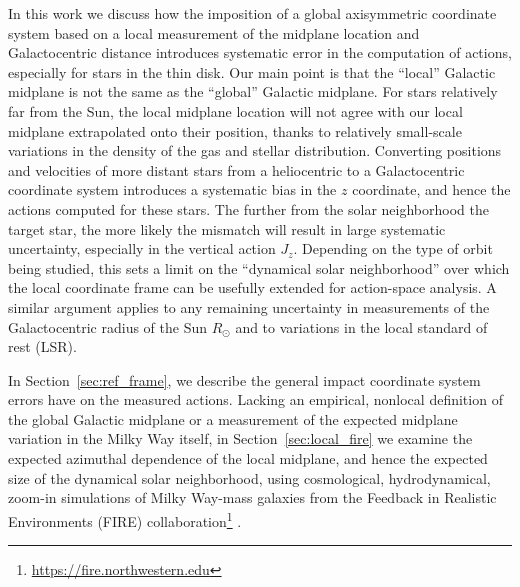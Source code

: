 \documentclass[twocolumn]{aastex62}
\begin{document}
In this work we discuss how the imposition of a global axisymmetric coordinate
system based on a local measurement of the midplane location and
Galactocentric distance introduces systematic error in the computation of
actions, especially for stars in the thin disk. Our main point is that the
``local'' Galactic midplane is not the same as the ``global'' Galactic
midplane. For stars relatively far from the Sun, the local midplane location
will not agree with our local midplane extrapolated onto their position,
thanks to relatively small-scale variations in the density of the gas and
stellar distribution. Converting positions and velocities of more distant
stars from a heliocentric to a Galactocentric coordinate system introduces a
systematic bias in the $z$ coordinate, and hence the actions computed for
these stars. The further from the solar neighborhood the target star, the more
likely the mismatch will result in large systematic uncertainty, especially in
the vertical action $J_z$. Depending on the type of orbit being studied, this
sets a limit on the ``dynamical solar neighborhood'' over which the local
coordinate frame can be usefully extended for action-space analysis. A similar
argument applies to any remaining uncertainty in measurements of the
Galactocentric radius of the Sun $R_{\odot}$ and to variations in the local
standard of rest (LSR).

In Section~\ref{sec:ref_frame}, we describe the general impact coordinate
system errors have on the measured actions. Lacking an empirical, nonlocal
definition of the global Galactic midplane or a measurement of the expected
midplane variation in the Milky Way itself,  in Section~\ref{sec:local_fire}
we examine the expected azimuthal dependence of the local midplane, and hence
the expected size of the dynamical solar neighborhood, using cosmological,
hydrodynamical, zoom-in simulations of Milky Way-mass galaxies from the
Feedback in Realistic Environments (FIRE)
collaboration\footnote{\url{https://fire.northwestern.edu}}
\citep{2016ApJ...827L..23W, 2017arXiv170206148H}.
\end{document}
